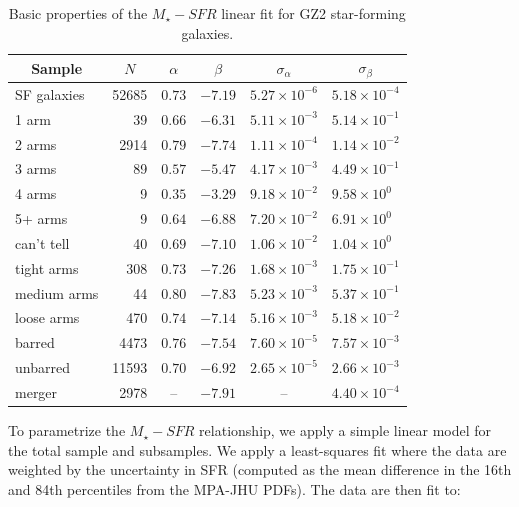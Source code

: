 \documentclass{emulateapj}
\begin{document}
\begin{table} \caption{Basic properties of the $M_\star-SFR$ linear fit for GZ2 star-forming galaxies.}
 \begin{tabular}{@{}lrcrcl}
 \hline
\multicolumn{1}{c}{Sample} &
\multicolumn{1}{c}{$N$} &
\multicolumn{1}{c}{$\alpha$} &
\multicolumn{1}{c}{$\beta$} &
\multicolumn{1}{c}{$\sigma_\alpha$} &
\multicolumn{1}{c}{$\sigma_\beta$} 
\\ 
\hline
\hline						
SF galaxies  & 52685   & $0.73$  & $-7.19$   & $5.27\times10^{-6}$  & $5.18\times10^{-4}$  \\
\hline
1 arm        & 39      & $0.66$  & $-6.31$  &  $5.11\times10^{-3}$  & $5.14\times10^{-1}$  \\
2 arms       & 2914    & $0.79$  & $-7.74$  &  $1.11\times10^{-4}$  & $1.14\times10^{-2}$  \\
3 arms       & 89      & $0.57$  & $-5.47$  &  $4.17\times10^{-3}$  & $4.49\times10^{-1}$  \\
4 arms       & 9       & $0.35$  & $-3.29$  &  $9.18\times10^{-2}$  & $9.58\times10^{0 }$  \\
5+ arms      & 9       & $0.64$  & $-6.88$  &  $7.20\times10^{-2}$  & $6.91\times10^{0 }$  \\
can't tell   & 40      & $0.69$  & $-7.10$  &  $1.06\times10^{-2}$  & $1.04\times10^{0 }$  \\
\hline
tight arms   &  308    & $0.73$  & $-7.26$  &  $1.68\times10^{-3}$  & $1.75\times10^{-1}$  \\
medium arms  &  44     & $0.80$  & $-7.83$  &  $5.23\times10^{-3}$  & $5.37\times10^{-1}$  \\
loose arms   &  470    & $0.74$  & $-7.14$  &  $5.16\times10^{-3}$  & $5.18\times10^{-2}$  \\
\hline
barred       &  4473   & $0.76$  & $-7.54$  &  $7.60\times10^{-5}$  & $7.57\times10^{-3}$  \\
unbarred     &  11593  & $0.70$  & $-6.92$  &  $2.65\times10^{-5}$  & $2.66\times10^{-3}$  \\
\hline
merger       &  2978   & --      & $-7.91$  &  --                   & $4.40\times10^{-4}$  \\
\hline
 \end{tabular}
\end{table}

To parametrize the $M_\star-SFR$ relationship, we apply a simple linear model for the total sample and subsamples. We apply a least-squares fit where the data are weighted by the uncertainty in SFR (computed as the mean difference in the 16th and 84th percentiles from the MPA-JHU PDFs). The data are then fit to:
\end{document}
